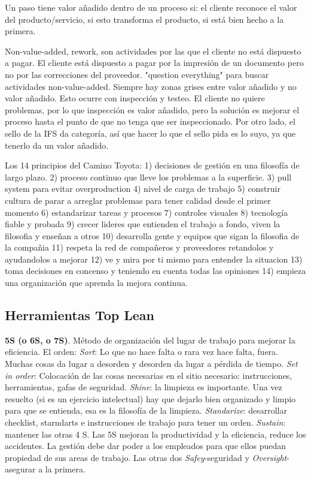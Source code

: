 \documentclass[]{article}
\begin{document}
Un paso tiene valor añadido dentro de un proceso si: el cliente reconoce el valor del producto/servicio, si esto transforma el producto, si está bien hecho a la primera.

Non-value-added, rework, son actividades por las que el cliente no está dispuesto a pagar. El cliente está dispuesto a pagar por la impresión de un documento pero no por las correcciones del proveedor. "question everything" para buscar actividades non-value-added. Siempre hay zonas grises entre valor añadido y no valor añadido. Esto ocurre con inspección y testeo. El cliente no quiere problemas, por lo que inspección es valor añadido, pero la solución es mejorar el proceso hasta el punto de que no tenga que ser inspeccionado. Por otro lado, el sello de la IFS da categoría, así que hacer lo que el sello pida es lo suyo, ya que tenerlo da un valor añadido.

Los 14 principios del Camino Toyota: 1) decisiones de gestión en una filosofía de largo plazo. 2) proceso continuo que lleve los problemas a la superficie. 3) pull system para evitar overproduction 4) nivel de carga de trabajo 5) construir cultura de parar a arreglar problemas para tener calidad desde el primer momento 6) estandarizar tareas y procesos 7) controles visuales 8) tecnología fiable y probada 9) crecer lideres que entienden el trabajo a fondo, viven la filosofia y enseñan a otros 10) desarrolla gente y equipos que sigan la filosofia de la compañia 11) respeta la red de compañeros y proveedores retandolos y ayudandolos a mejorar 12) ve y mira por ti mismo para entender la situacion 13) toma decisiones en concenso y teniendo en cuenta todas las opiniones 14) empieza una organización que aprenda la mejora continua.

\subsection{Herramientas Top Lean}

\textbf{5S (o 6S, o 7S)}. Método de organización del lugar de trabajo para mejorar la eficiencia. El orden: \textit{Sort}: Lo que no hace falta o rara vez hace falta, fuera. Muchas cosas da lugar a desorden y desorden da lugar a pérdida de tiempo. \textit{Set in order}: Colocación de las cosas necesarias en el sitio necesario: instrucciones, herramientas, gafas de seguridad. \textit{Shine}: la limpieza es importante. Una vez resuelto (si es un ejercicio intelectual) hay que dejarlo bien organizado y limpio para que se entienda, esa es la filosofía de la limpieza. \textit{Standarize}: desarrollar checklist, starndarts e instrucciones de trabajo para tener un orden. \textit{Sustain}: mantener las otras 4 S. Las 5S mejoran la productividad y la eficiencia, reduce los accidentes. La gestión debe dar poder a los empleados para que ellos puedan propiedad de sus areas de trabajo. Las otras dos \textit{Safey}-seguridad y \textit{Oversight}-asegurar a la primera.
\end{document}
